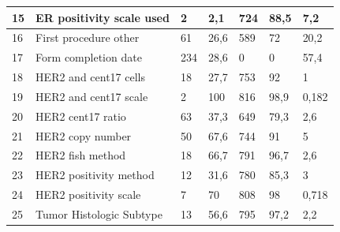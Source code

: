 \begin{table}[!htb]
\begin{threeparttable}
\begin{tabular}{p{0.5cm} p{4cm} p{1.5cm} p{2cm} p{1.5cm} p{2cm} p{1.5cm}}
			\\ \hline	15	&	ER positivity scale used	&	2	&	2,1	&	724	&	88,5	&	7,2
			\\ \hline	16	&	First procedure other	&	61	&	26,6	&	589	&	72	&	20,2
			\\ \hline	17	&	Form completion date	&	234	&	28,6	&	0	&	0	&	57,4
			\\ \hline	18	&	HER2 and cent17 cells 	&	18	&	27,7	&	753	&	92	&	1
			\\ \hline	19	&	HER2 and cent17 scale 	&	2	&	100	&	816	&	98,9	&	0,182
			\\ \hline	20	&	HER2 cent17 ratio	&	63	&	37,3	&	649	&	79,3	&	2,6
			\\ \hline	21	&	HER2 copy number	&	50	&	67,6	&	744	&	91	&	5
			\\ \hline	22	&	HER2 fish method	&	18	&	66,7	&	791	&	96,7	&	2,6
			\\ \hline	23	&	HER2 positivity method 	&	12	&	31,6	&	780	&	85,3	&	3
			\\ \hline	24	&	HER2 positivity scale 	&	7	&	70	&	808	&	98	&	0,718
			\\ \hline	25	&	Tumor Histologic Subtype	&	13	&	56,6	&	795	&	97,2	&	2,2
			\\ \hline
		\end{tabular}
	\end{threeparttable}
\end{table}
\clearpage
